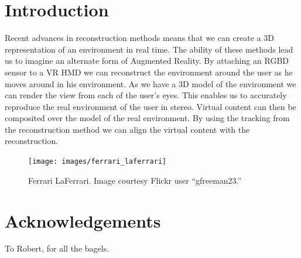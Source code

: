 \documentclass{acmsiggraph}
\begin{document}

%
%


\keywordlist

\conceptlist

\printcopyright

\section{Introduction}


Recent advances in reconstruction methods means that we can create a 3D representation of an environment in real time. The ability of these methods lead us to imagine an alternate form of Augmented Reality. By attaching an RGBD sensor to a VR HMD we can reconstruct the environment around the user as he moves around in his environment. As we have a 3D model of the environment we can render the view from each of the user's eyes. This enables us to accurately reproduce the real environment of the user in stereo. Virtual content can then be composited over the model of the real environment. By using the tracking from the reconstruction method we can align the virtual content with the reconstruction. 

\begin{figure}[ht]
	\centering
	\texttt{[image: images/ferrari\_laferrari]}
	\caption{Ferrari LaFerrari. Image courtesy Flickr user ``gfreeman23.''}
	\label{fig:ferrari}
\end{figure}









\section*{Acknowledgements}

To Robert, for all the bagels.


\nocite{*}

\end{document}
